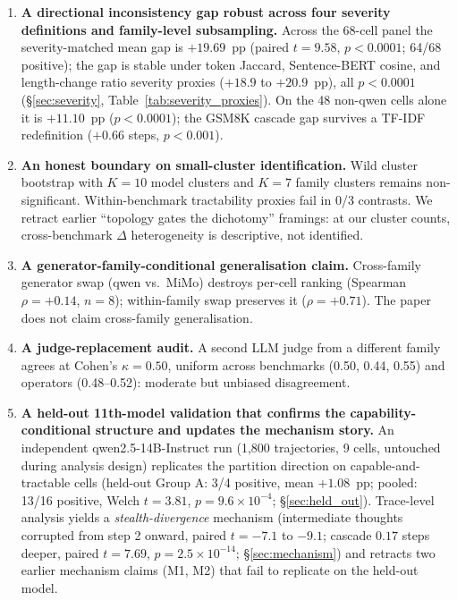 \documentclass[11pt]{article}
\begin{document}
\begin{enumerate}
\item \textbf{A directional inconsistency gap robust across four severity definitions and family-level subsampling.} Across the 68-cell panel the severity-matched mean gap is $+19.69$~pp (paired $t=9.58$, $p<0.0001$; 64/68 positive); the gap is stable under token Jaccard, Sentence-BERT cosine, and length-change ratio severity proxies ($+18.9$ to $+20.9$~pp), all $p<0.0001$ (\S\ref{sec:severity}, Table~\ref{tab:severity_proxies}). On the 48 non-qwen cells alone it is $+11.10$~pp ($p<0.0001$); the GSM8K cascade gap survives a TF-IDF redefinition ($+0.66$ steps, $p<0.001$).
\item \textbf{An honest boundary on small-cluster identification.} Wild cluster bootstrap with $K{=}10$ model clusters and $K{=}7$ family clusters remains non-significant. Within-benchmark tractability proxies fail in 0/3 contrasts. We retract earlier ``topology gates the dichotomy'' framings: at our cluster counts, cross-benchmark $\Delta$ heterogeneity is descriptive, not identified.
\item \textbf{A generator-family-conditional generalisation claim.} Cross-family generator swap (qwen vs.\ MiMo) destroys per-cell ranking (Spearman $\rho=+0.14$, $n{=}8$); within-family swap preserves it ($\rho=+0.71$). The paper does not claim cross-family generalisation.
\item \textbf{A judge-replacement audit.} A second LLM judge from a different family agrees at Cohen's $\kappa=0.50$, uniform across benchmarks (0.50, 0.44, 0.55) and operators (0.48--0.52): moderate but unbiased disagreement.
\item \textbf{A held-out 11th-model validation that confirms the capability-conditional structure and updates the mechanism story.} An independent qwen2.5-14B-Instruct run (1{,}800 trajectories, 9 cells, untouched during analysis design) replicates the partition direction on capable-and-tractable cells (held-out Group A: 3/4 positive, mean $+1.08$~pp; pooled: 13/16 positive, Welch $t=3.81$, $p=9.6\!\times\!10^{-4}$; \S\ref{sec:held_out}). Trace-level analysis yields a \emph{stealth-divergence} mechanism (intermediate thoughts corrupted from step 2 onward, paired $t=-7.1$ to $-9.1$; cascade $0.17$ steps deeper, paired $t=7.69$, $p=2.5\!\times\!10^{-14}$; \S\ref{sec:mechanism}) and retracts two earlier mechanism claims (M1, M2) that fail to replicate on the held-out model.
\end{enumerate}
\end{document}
